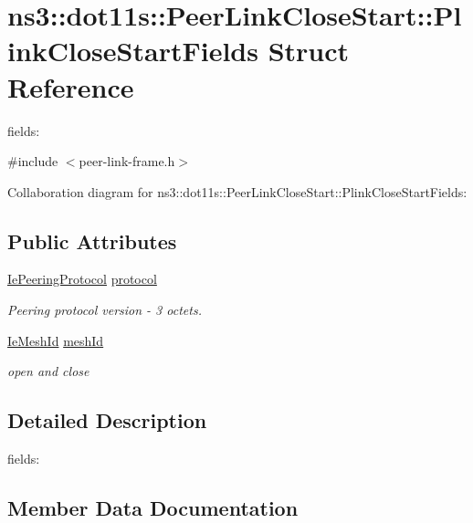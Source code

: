 \hypertarget{structns3_1_1dot11s_1_1PeerLinkCloseStart_1_1PlinkCloseStartFields}{}\section{ns3\+:\+:dot11s\+:\+:Peer\+Link\+Close\+Start\+:\+:Plink\+Close\+Start\+Fields Struct Reference}
\label{structns3_1_1dot11s_1_1PeerLinkCloseStart_1_1PlinkCloseStartFields}


fields\+:  




{\ttfamily \#include $<$peer-\/link-\/frame.\+h$>$}



Collaboration diagram for ns3\+:\+:dot11s\+:\+:Peer\+Link\+Close\+Start\+:\+:Plink\+Close\+Start\+Fields\+:
\subsection*{Public Attributes}
\begin{DoxyCompactItemize}
\item 
\hyperlink{classns3_1_1dot11s_1_1IePeeringProtocol}{Ie\+Peering\+Protocol} \hyperlink{structns3_1_1dot11s_1_1PeerLinkCloseStart_1_1PlinkCloseStartFields_ad6dc172ca5777398b8c85c18fa8c9e1b}{protocol}
\begin{DoxyCompactList}\small\item\em Peering protocol version -\/ 3 octets. \end{DoxyCompactList}\item 
\hyperlink{classns3_1_1dot11s_1_1IeMeshId}{Ie\+Mesh\+Id} \hyperlink{structns3_1_1dot11s_1_1PeerLinkCloseStart_1_1PlinkCloseStartFields_a3ab466662b52bcfa68ee148321b9625b}{mesh\+Id}
\begin{DoxyCompactList}\small\item\em open and close \end{DoxyCompactList}\end{DoxyCompactItemize}


\subsection{Detailed Description}
fields\+: 

\subsection{Member Data Documentation}
